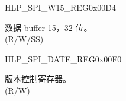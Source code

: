 \begin{register}{H}{LP\_SPI\_W15\_REG}{0x00D4}\label{regdesc:LPSPIW15REG}
%
\regnewline%
\begin{regdesc}\begin{reglist}
\label{fielddesc:LPSPIBUF15}\item [LP\_SPI\_BUF15] 数据 buffer 15，32 位。\\
(R/W/SS)
\end{reglist}\end{regdesc}
\end{register}


\begin{register}{H}{LP\_SPI\_DATE\_REG}{0x00F0}\label{regdesc:LPSPIDATEREG}
%
%
\regnewline%
\begin{regdesc}\begin{reglist}
\label{fielddesc:LPSPIDATE}\item [LP\_SPI\_DATE] 版本控制寄存器。 \\
(R/W)
\end{reglist}\end{regdesc}
\end{register}


